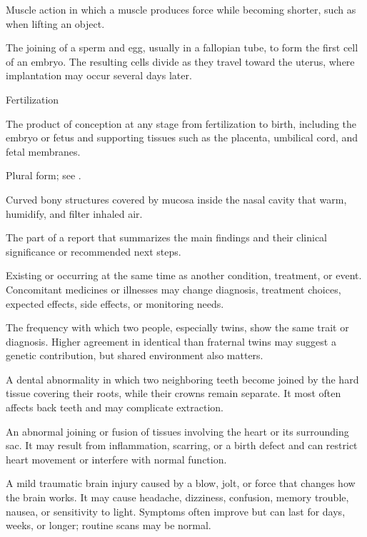  Muscle action in which a muscle produces force while becoming shorter, such as when lifting an object.

 The joining of a sperm and egg, usually in a fallopian tube, to form the first cell of an embryo. The resulting cells divide as they travel toward the uterus, where implantation may occur several days later.

\synonyms
Fertilization

 The product of conception at any stage from fertilization to birth, including the embryo or fetus and supporting tissues such as the placenta, umbilical cord, and fetal membranes.

 Plural form; see .

 Curved bony structures covered by mucosa inside the nasal cavity that warm, humidify, and filter inhaled air.

 The part of a report that summarizes the main findings and their clinical significance or recommended next steps.

 Existing or occurring at the same time as another condition, treatment, or event. Concomitant medicines or illnesses may change diagnosis, treatment choices, expected effects, side effects, or monitoring needs.

 The frequency with which two people, especially twins, show the same trait or diagnosis. Higher agreement in identical than fraternal twins may suggest a genetic contribution, but shared environment also matters.

 A dental abnormality in which two neighboring teeth become joined by the hard tissue covering their roots, while their crowns remain separate. It most often affects back teeth and may complicate extraction.

 An abnormal joining or fusion of tissues involving the heart or its surrounding sac. It may result from inflammation, scarring, or a birth defect and can restrict heart movement or interfere with normal function.

 A mild traumatic brain injury caused by a blow, jolt, or force that changes how the brain works. It may cause headache, dizziness, confusion, memory trouble, nausea, or sensitivity to light. Symptoms often improve but can last for days, weeks, or longer; routine scans may be normal.

